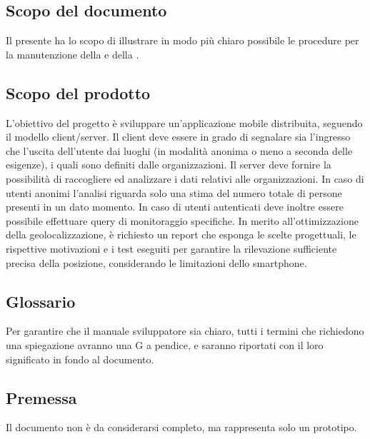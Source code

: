 \documentclass[../manuale-sviluppatore.tex]{subfiles}
\begin{document}
\subsection{Scopo del documento}%
\label{sub:scopo_del_documento}
Il presente  ha lo scopo di illustrare in modo più chiaro possibile le procedure per la manutenzione della  e della .

\subsection{Scopo del prodotto}%
\label{sub:scopo_del_prodotto}
L'obiettivo del progetto è sviluppare un'applicazione mobile distribuita, seguendo il modello client/server.
Il client deve essere in grado di segnalare sia l'ingresso che l'uscita dell'utente dai luoghi (in modalità anonima o meno a seconda delle esigenze), i quali sono definiti dalle organizzazioni.
Il server deve fornire la possibilità di raccogliere ed analizzare i dati relativi alle organizzazioni.
In caso di utenti anonimi l'analisi riguarda solo una stima del numero totale di persone presenti in un dato momento.
In caso di utenti autenticati deve inoltre essere possibile effettuare query di monitoraggio specifiche.
In merito all'ottimizzazione della geolocalizzazione, è richiesto un report che esponga le scelte progettuali, le rispettive motivazioni e i test eseguiti per garantire la rilevazione sufficiente precisa della posizione, considerando le limitazioni dello smartphone.

\subsection{Glossario}%
\label{sub:glossario}
Per garantire che il manuale sviluppatore sia chiaro, tutti i termini che richiedono una spiegazione avranno una G a pendice, e saranno riportati con il loro significato in fondo al documento.

\subsection{Premessa}%
\label{sub:glossario}
Il documento non è da considerarsi completo, ma rappresenta solo un prototipo.
\end{document}

